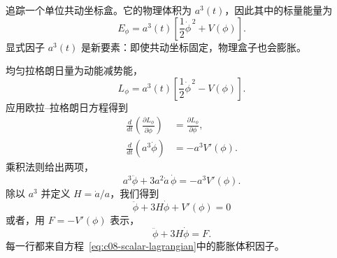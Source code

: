追踪一个单位共动坐标盒。它的物理体积为 \(a^3(t)\)，因此其中的标量能量为
\begin{equation}
E_\phi
=a^3(t)
\left[
\frac12\dot\phi^{\,2}+V(\phi)
\right].
\end{equation}
显式因子 \(a^3(t)\) 是新要素：即使共动坐标固定，物理盒子也会膨胀。

\begin{classroomqa}
\end{classroomqa}

\begin{classroomqa}
\end{classroomqa}

\begin{classroomqa}
\end{classroomqa}

均匀拉格朗日量为动能减势能，
\begin{equation}
L_\phi=a^3(t)
\left[
\frac12\dot\phi^{\,2}-V(\phi)
\right].
\label{eq:c08-scalar-lagrangian}
\end{equation}
应用欧拉--拉格朗日方程得到
\begin{align}
\frac{d}{dt}\left(\frac{\partial L_\phi}{\partial\dot\phi}\right)
&=
\frac{\partial L_\phi}{\partial\phi},\\
\frac{d}{dt}\left(a^3\dot\phi\right)
&=-a^3V'(\phi).
\end{align}
乘积法则给出两项，
\begin{equation}
a^3\ddot\phi+3a^2\dot a\,\dot\phi
=-a^3V'(\phi).
\end{equation}
除以 \(a^3\) 并定义 \(H=\dot a/a\)，我们得到
\begin{equation}
\boxed{
\ddot\phi+3H\dot\phi+V'(\phi)=0
}
\label{eq:c08-hubble-friction}
\end{equation}
或者，用 \(F=-V'(\phi)\) 表示，
\begin{equation}
\ddot\phi+3H\dot\phi=F.
\end{equation}
每一行都来自方程~\eqref{eq:c08-scalar-lagrangian}中的膨胀体积因子。

